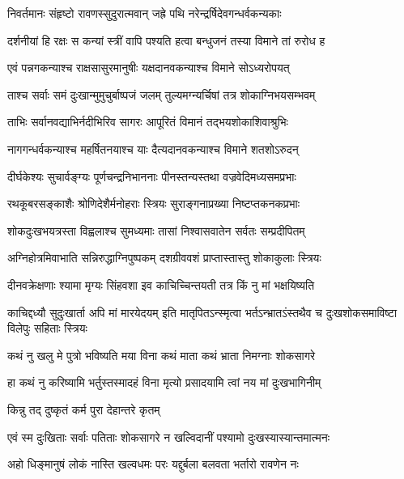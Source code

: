 
\twolineshloka
{निवर्तमानः संहृष्टो रावणस्सुदुरात्मवान्}
{जह्रे पथि नरेन्द्रर्षिदेवगन्धर्वकन्यकाः} %

\twolineshloka
{दर्शनीयां हि रक्षः स कन्यां स्त्रीं वापि पश्यति}
{हत्वा बन्धुजनं तस्या विमाने तां रुरोध ह} %

\twolineshloka
{एवं पन्नगकन्याश्च राक्षसासुरमानुषीः}
{यक्षदानवकन्याश्च विमाने सोऽध्यरोपयत्} %

\twolineshloka
{ताश्च सर्वाः समं दुःखान्मुमुचुर्बाष्पजं जलम्}
{तुल्यमग्न्यर्चिषां तत्र शोकाग्निभयसम्भवम्} %

\twolineshloka
{ताभिः सर्वानवद्याभिर्नदीभिरिव सागरः}
{आपूरितं विमानं तद्भयशोकाशिवाश्रुभिः} %

\twolineshloka
{नागगन्धर्वकन्याश्च महर्षितनयाश्च याः}
{दैत्यदानवकन्याश्च विमाने शतशोऽरुदन्} %

\twolineshloka
{दीर्घकेश्यः सुचार्वङ्ग्यः पूर्णचन्द्रनिभाननाः}
{पीनस्तन्यस्तथा वज्रवेदिमध्यसमप्रभाः} %

\twolineshloka
{रथकूबरसङ्काशैः श्रोणिदेशैर्मनोहराः}
{स्त्रियः सुराङ्गनाप्रख्या निष्टप्तकनकप्रभाः} %

\twolineshloka
{शोकदुःखभयत्रस्ता विह्वलाश्च सुमध्यमाः}
{तासां निश्वासवातेन सर्वतः सम्प्रदीपितम्} %

\twolineshloka
{अग्निहोत्रमिवाभाति सन्निरुद्धाग्निपुष्पकम्}
{दशग्रीववशं प्राप्तास्तास्तु शोकाकुलाः स्त्रियः} %

\twolineshloka
{दीनवक्रेक्षणाः श्यामा मृग्यः सिंहवशा इव}
{काचिच्चिन्तयती तत्र किं नु मां भक्षयिष्यति} %

\threelineshloka
{काचिद्दध्यौ सुदुःखार्ता अपि मां मारयेदयम्}
{इति मातृपितऽन्स्मृत्वा भर्तऽन्भ्रातऽंस्तथैव च}
{दुःखशोकसमाविष्टा विलेपुः सहिताः स्त्रियः} %

\twolineshloka
{कथं नु खलु मे पुत्रो भविष्यति मया विना}
{कथं माता कथं भ्राता निमग्नाः शोकसागरे} %

\twolineshloka
{हा कथं नु करिष्यामि भर्तुस्तस्मादहं विना}
{मृत्यो प्रसादयामि त्वां नय मां दुःखभागिनीम्} %

\onelineshloka
{किन्नु तद् दुष्कृतं कर्म पुरा देहान्तरे कृतम्} %

\twolineshloka
{एवं स्म दुःखिताः सर्वाः पतिताः शोकसागरे}
{न खल्विदानीं पश्यामो दुःखस्यास्यान्तमात्मनः} %

\twolineshloka
{अहो धिङ्मानुषं लोकं नास्ति खल्वधमः परः}
{यद्दुर्बला बलवता भर्तारो रावणेन नः} %

